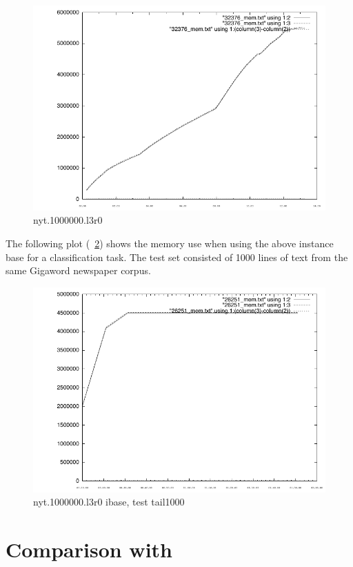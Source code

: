 \documentclass[a4paper,10pt,twoside]{report}
\begin{document}
\begin{figure}[!ht]
  \centering
  \includegraphics[width=\pdfwidth]{32376_mem.pdf}
 \caption{nyt.1000000.l3r0}
  \label{fig:32376_mem.pdf}
\end{figure}

The following plot (\figurename~\ref{fig:26251_mem.pdf}) shows the
memory use when using the above instance base for a classification
task. The test set consisted of \num{1000} lines of text from the same
Gigaword newspaper corpus.

\begin{figure}[!ht]
  \centering
  \includegraphics[width=\pdfwidth]{26251_mem.pdf}
 \caption{nyt.1000000.l3r0 ibase, test tail1000}
  \label{fig:26251_mem.pdf}
\end{figure}

\section{Comparison with \srilm{}}
\end{document}
